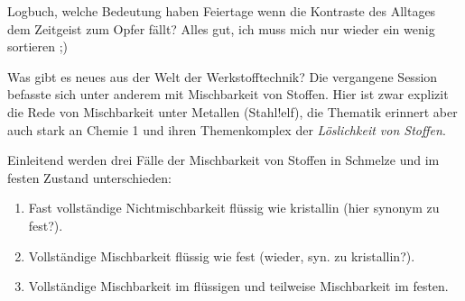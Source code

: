 Logbuch, welche Bedeutung haben Feiertage wenn die Kontraste des Alltages dem Zeitgeist zum Opfer fällt?
Alles gut, ich muss mich nur wieder ein wenig sortieren ;)

Was gibt es neues aus der Welt der Werkstofftechnik? Die vergangene Session befasste sich unter anderem mit Mischbarkeit von Stoffen.
Hier ist zwar explizit die Rede von Mischbarkeit unter Metallen (Stahl!elf), die Thematik erinnert aber
auch stark an Chemie 1 und ihren Themenkomplex der \textit{Löslichkeit von Stoffen}.\par
Einleitend werden drei Fälle der Mischbarkeit von Stoffen in Schmelze und im festen Zustand unterschieden:

\begin{enumerate}
    \item Fast vollständige Nichtmischbarkeit flüssig wie kristallin (hier synonym zu fest?).
    \item Vollständige Mischbarkeit flüssig wie fest (wieder, syn. zu kristallin?).
    \item Vollständige Mischbarkeit im flüssigen und teilweise Mischbarkeit im festen.
\end{enumerate}

